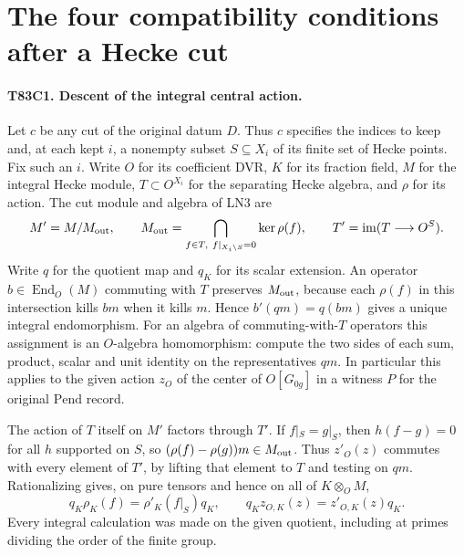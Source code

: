 \section{The four compatibility conditions after a Hecke cut}

\paragraph{T83C1. Descent of the integral central action.}
Let $c$ be any cut of the original datum $D$. Thus $c$ specifies
the indices to keep and, at each kept $i$, a nonempty subset
$S\subseteq X_i$ of its finite set of Hecke points. Fix such an
$i$. Write $O$ for its coefficient DVR, $K$ for its fraction
field, $M$ for the integral Hecke module, $T\subset O^{X_i}$
for the separating Hecke algebra, and $\rho$ for its action.
The cut module and algebra of LN3 are
\[
 M'=M/M_{\rm out},\qquad
 M_{\rm out}=\bigcap_{f\in T,\ f|_{X_i\setminus S}=0}\ker\rho(f),
 \qquad T'=\operatorname{im}(T\longrightarrow O^S).
\]
Write $q$ for the quotient map and $q_K$ for its scalar extension.
An operator $b\in\operatorname{End}_O(M)$ commuting with $T$
preserves $M_{\rm out}$, because each $\rho(f)$ in this
intersection kills $bm$ when it kills $m$. Hence
$b'(q m)=q(bm)$ gives a unique integral endomorphism. For an
algebra of commuting-with-$T$ operators this assignment is an
$O$-algebra homomorphism: compute the two sides of each sum,
product, scalar and unit identity on the representatives $qm$.
In particular this applies to the given action $z_O$ of the
center of $O[G_{0g}]$ in a witness $P$ for the original
$\mathrm{Pend}$ record.

The action of $T$ itself on $M'$ factors through $T'$. If
$f|_S=g|_S$, then $h(f-g)=0$ for all $h$ supported on $S$,
so $(\rho(f)-\rho(g))m\in M_{\rm out}$. Thus $z'_O(z)$ commutes
with every element of $T'$, by lifting that element to $T$ and
testing on $qm$. Rationalizing gives, on pure tensors and hence
on all of $K\otimes_O M$,
\[
       q_K\rho_K(f)=\rho'_K(f|_S)q_K,\qquad
       q_K z_{O,K}(z)=z'_{O,K}(z)q_K .
\]
Every integral calculation was made on the given quotient, including
at primes dividing the order of the finite group.

